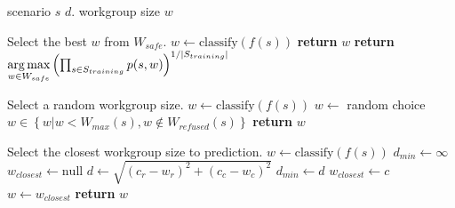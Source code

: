 \begin{algorithmic}[1]
\Require scenario $s$
$d$.
\Ensure workgroup size $w$

\Comment Select the best $w$ from $W_{safe}$.
\State $w \leftarrow \text{classify}(f(s))$
    \State \textbf{return} $w$
\Else
  \State \textbf{return} $\underset{w \in W_{safe}}{\operatorname*{arg\,max}}
\left(
  \prod_{s \in S_{training}} p(s, w)
\right)^{1/|S_{training}|}$
\EndIf
\EndProcedure
\item[] %

\Comment Select a random workgroup size.
\State $w \leftarrow \text{classify}(f(s))$
  \State $w \leftarrow $ random choice $w \in \left\{ w | w < W_{max}(s), w \not\in W_{refused}(s) \right\}$
\EndWhile
\State \textbf{return} $w$
\EndProcedure
\item[] %

\Comment Select the closest workgroup size to prediction.
\State $w \leftarrow \text{classify}(f(s))$
  \State $d_{min} \leftarrow \infty$
  \State $w_{closest} \leftarrow \text{null}$
    \State $d \leftarrow \sqrt{\left(c_r - w_r\right)^2 + \left(c_c - w_c\right)^2}$
      \State $d_{min} \leftarrow d$
      \State $w_{closest} \leftarrow c$
    \EndIf
  \EndFor
  \State $w \leftarrow w_{closest}$
\EndWhile
\State \textbf{return} $w$
\EndProcedure
\end{algorithmic}
